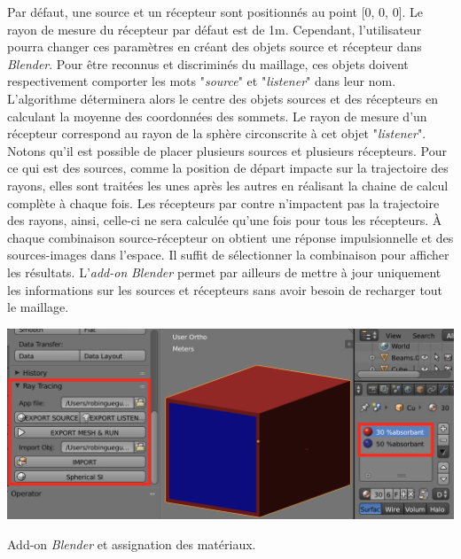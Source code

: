 Par défaut, une source et un récepteur sont positionnés au point [0, 0, 0]. Le rayon de mesure du récepteur par défaut est de 1m. Cependant, l'utilisateur pourra changer ces paramètres en créant des objets source et récepteur dans \textit{Blender}. Pour être reconnus et discriminés du maillage, ces objets doivent respectivement comporter les mots "\textit{source}" et "\textit{listener}" dans leur nom. L'algorithme déterminera alors le centre des objets sources et des récepteurs en calculant la moyenne des coordonnées des sommets. Le rayon de mesure d'un récepteur correspond au rayon de la sphère circonscrite à cet objet "\textit{listener}". Notons qu'il est possible de placer plusieurs sources et plusieurs récepteurs. Pour ce qui est des sources, comme la position de départ impacte sur la trajectoire des rayons, elles sont traitées les unes après les autres en réalisant la chaine de calcul complète à chaque fois. Les récepteurs par contre n'impactent pas la trajectoire des rayons, ainsi, celle-ci ne sera calculée qu'une fois pour tous les récepteurs. À chaque combinaison source-récepteur on obtient une réponse impulsionnelle et des sources-images dans l'espace. Il suffit de sélectionner la combinaison pour afficher les résultats. L'\textit{add-on} \textit{Blender} permet par ailleurs de mettre à jour uniquement les informations sur les sources et récepteurs sans avoir besoin de recharger tout le maillage. 
\begin{figureth}
	\includegraphics[width=\linewidth]{images/add-on}
	\caption{Add-on \textit{Blender} et assignation des matériaux.}
	\label{add-on}
\end{figureth}

